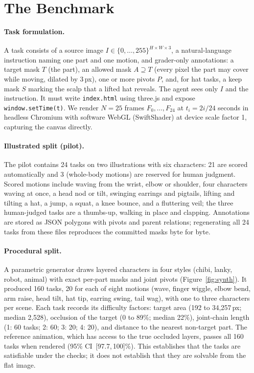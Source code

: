 \documentclass[11pt]{article}
\newcommand{\ci}[2]{\,[#1,\,#2]}
\begin{document}
\section{The Benchmark}
\label{sec:bench}

\paragraph{Task formulation.} A task consists of a source image $I\in\{0,\dots,255\}^{H\times W\times 3}$, a natural-language instruction naming one part and one motion, and grader-only annotations: a target mask $T$ (the part), an allowed mask $A\supseteq T$ (every pixel the part may cover while moving, dilated by 3\,px), one or more pivots $P$, and, for hat tasks, a keep mask $S$ marking the scalp that a lifted hat reveals. The agent sees only $I$ and the instruction. It must write \texttt{index.html} using three.js and expose \texttt{window.setTime(t)}. We render $N=25$ frames $F_0,\dots,F_{24}$ at $t_i = 2i/24$ seconds in headless Chromium with software WebGL (SwiftShader) at device scale factor 1, capturing the canvas directly.

\paragraph{Illustrated split (pilot).} The pilot contains 24 tasks on two illustrations with six characters: 21 are scored automatically and 3 (whole-body motions) are reserved for human judgment. Scored motions include waving from the wrist, elbow or shoulder, four characters waving at once, a head nod or tilt, swinging earrings and pigtails, lifting and tilting a hat, a jump, a squat, a knee bounce, and a fluttering veil; the three human-judged tasks are a thumbs-up, walking in place and clapping. Annotations are stored as JSON polygons with pivots and parent relations; regenerating all 24 tasks from these files reproduces the committed masks byte for byte.

\paragraph{Procedural split.} A parametric generator draws layered characters in four styles (chibi, lanky, robot, animal) with exact per-part masks and joint pivots (Figure~\ref{fig:synth}). It produced 160 tasks, 20 for each of eight motions (wave, finger wiggle, elbow bend, arm raise, head tilt, hat tip, earring swing, tail wag), with one to three characters per scene. Each task records its difficulty factors: target area (192 to 34{,}257\,px; median 2{,}528), occlusion of the target (0 to 89\%; median 22\%), joint-chain length (1: 60 tasks; 2: 60; 3: 20; 4: 20), and distance to the nearest non-target part. The reference animation, which has access to the true occluded layers, passes all 160 tasks when rendered (95\% CI \ci{97.7}{100}\%). This establishes that the tasks are satisfiable under the checks; it does not establish that they are solvable from the flat image.
\end{document}
